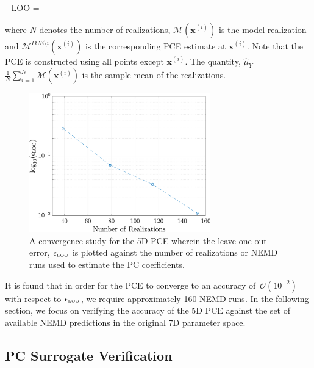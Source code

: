 \be
\epsilon_{\tiny{\mbox{LOO}}} = 
\label{eq:loo}
\ee 

\noindent where $N$ denotes the number of realizations, $\mathcal{M}(\bm{x}^{(i)})$ is the
model realization and $\mathcal{M}^{PCE\setminus i}(\bm{x}^{(i)})$ is the corresponding PCE estimate
at $\bm{x}^{(i)}$. Note that the PCE is constructed using all points except $\bm{x}^{(i)}$.
The quantity, $\hat{\mu}_Y$ = $\frac{1}{N}\sum\limits_{i=1}^{N}\mathcal{M}(\bm{x}^{(i)})$
is the sample mean of the realizations.

\begin{figure}[htbp]
 \begin{center}
  \includegraphics[width=0.70\textwidth]{./Figures/PCE5D_eloo}
\caption{A convergence study for the 5D PCE wherein the leave-one-out
error, $\epsilon_{\tiny{\mbox{LOO}}}$ is plotted against the number of
realizations or NEMD runs used to estimate the PC coefficients.}
\label{fig:loo}
\end{center}
\end{figure}
 
It is found that in order for the PCE to converge to an accuracy of~$\mathcal{O}(10^{-2})$
with respect to $\epsilon_{\tiny{\mbox{LOO}}}$, we require approximately 160 NEMD runs. In the
following section, we focus on verifying the accuracy of the 5D PCE against the set of available
NEMD predictions in the original 7D parameter space. 

\subsection{PC Surrogate Verification}

